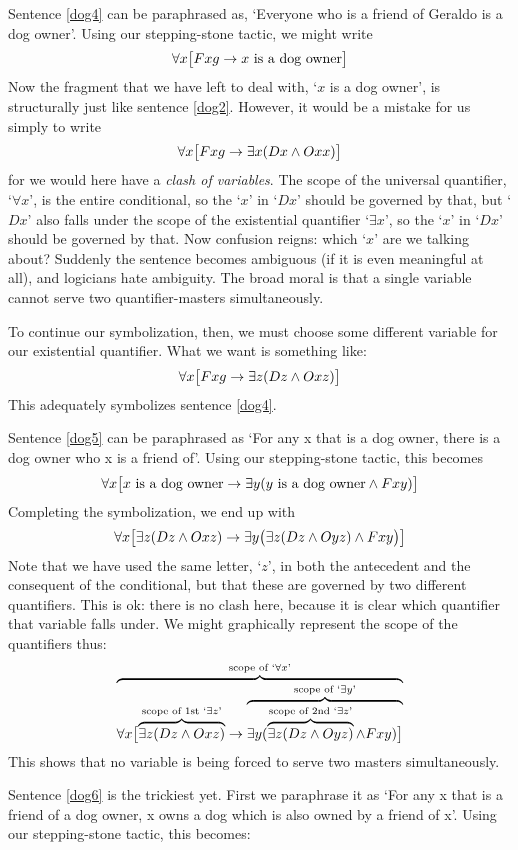 Sentence \ref{dog4} can be paraphrased as, `Everyone who is a friend of Geraldo is a dog owner'. Using our stepping-stone tactic, we might write 
$$\forall x \bigl[Fxg \rightarrow x \text{ is a dog owner}\bigr]$$
Now the fragment that we have left to deal with, `$x$ is a dog owner', is structurally just like sentence \ref{dog2}. However, it would be a mistake for us simply to write 
$$\forall x \bigl[Fxg \rightarrow \exists x(Dx \wedge Oxx)\bigr]$$
for we would here have a \emph{clash of variables}. The scope of the universal quantifier, `$\forall x$', is the entire conditional, so the `$x$' in `$Dx$' should be governed by that, but `$Dx$' also falls under the scope of the existential quantifier `$\exists x$', so the `$x$' in `$Dx$' should be governed by that. Now confusion reigns: which `$x$' are we talking about? Suddenly the sentence becomes ambiguous (if it is even meaningful at all), and logicians hate ambiguity. The broad moral is that a single variable cannot serve two quantifier-masters simultaneously. 

To continue our symbolization, then, we must choose some different variable for our existential quantifier. What we want is something like:
$$\forall x\bigl[Fxg \rightarrow\exists z(Dz \wedge Oxz)\bigr]$$
This adequately symbolizes sentence \ref{dog4}.

Sentence \ref{dog5} can be paraphrased as `For any x that is a dog owner, there is a dog owner who x is a friend of'. Using our stepping-stone tactic, this becomes 
$$\forall x\bigl[\mbox{$x$ is a dog owner}\rightarrow\exists y(\mbox{$y$ is a dog owner}\wedge Fxy)\bigr]$$
Completing the symbolization, we end up with
$$\forall x\bigl[\exists z(Dz \wedge Oxz)\rightarrow\exists y\bigl(\exists z(Dz \wedge Oyz)\wedge Fxy\bigr)\bigr]$$
Note that we have used the same letter, `$z$', in both the antecedent and the consequent of the conditional, but that these are governed by two different quantifiers. This is ok: there is no clash here, because it is clear which quantifier that variable falls under. We might graphically represent the scope of the quantifiers thus:
$$\overbrace{\forall x\bigl[\overbrace{\exists z(Dz \wedge Oxz)}^{\text{scope of 1st `}\exists z\text{'}}\rightarrow \overbrace{\exists y(\overbrace{\exists z(Dz \wedge Oyz)}^{\text{scope of 2nd `}\exists z\text{'}}\wedge Fxy)\bigr]}^{\text{scope of `}\exists y\text{'}}}^{\text{scope of `}\forall x\text{'}}$$
This shows that no variable is being forced to serve two masters simultaneously.

Sentence \ref{dog6} is the trickiest yet. First we paraphrase it as `For any x that is a friend of a dog owner, x owns a dog which is also owned by a friend of x'. Using our stepping-stone tactic, this becomes:

